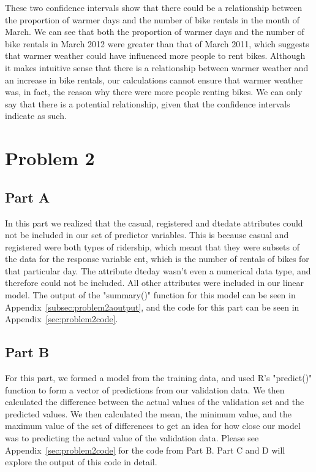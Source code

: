\documentclass[11pt]{article}
\begin{document}
These two confidence intervals show that there could be a relationship between the proportion of warmer days and the number of bike rentals in the month of March. We can see that both the proportion of warmer days and the number of bike rentals in March 2012 were greater than that of March 2011, which suggests that warmer weather could have influenced more people to rent bikes. Although it makes intuitive sense that there is a relationship between warmer weather and an increase in bike rentals, our calculations cannot ensure that warmer weather was, in fact, the reason why there were more people renting bikes. We can only say that there is a potential relationship, given that the confidence intervals indicate as such. 
\pagebreak



\section{Problem 2}
\label{sec:problem2}
\subsection{Part A}
\label{subsec:2a}
In this part we realized that the casual, registered and dtedate attributes could not be included in our set of predictor variables. This is because casual and registered were both types of ridership, which meant that they were subsets of the data for the response variable cnt, which is the number of rentals of bikes for that particular day. The attribute dteday wasn't even a numerical data type, and therefore could not be included. All other attributes were included in our linear model. The output of the "summary()" function for this model can be seen in Appendix~\ref{subsec:problem2aoutput}, and the code for this part can be seen in Appendix~\ref{sec:problem2code}.

\subsection{Part B}
\label{subsec:2b}
For this part, we formed a model from the training data, and used R's "predict()" function to form a vector of predictions from our validation data. We then calculated the difference between the actual values of the validation set and the predicted values. We then calculated the mean, the minimum value, and the maximum value of the set of differences to get an idea for how close our model was to predicting the actual value of the validation data. Please see Appendix~\ref{sec:problem2code} for the code from Part B. Part C and D will explore the output of this code in detail.   
\end{document}
